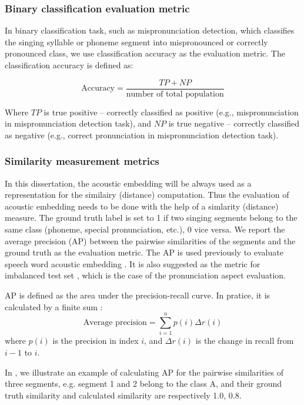 \subsubsection{Binary classification evaluation metric}

In binary classification task, such as mispronunciation detection, which classifies the singing syllable or phoneme segment into mispronounced or correctly pronounced class, we use classification accuracy as the evaluation metric. The classification accuracy is defined as:

\begin{equation}
\textrm{Accuracy} = \frac{TP + NP}{\textrm{number of total population}}
\end{equation}

Where $TP$ is true positive -- correctly classified as positive (e.g., mispronunciation in mispronunciation detection task), and $NP$ is true negative -- correctly classified as negative (e.g., correct pronunciation in mispronunciation detection task). 

\subsubsection{Similarity measurement metrics}

In this dissertation, the acoustic embedding will be always used as a representation for the similairy (distance) computation. Thus the evaluation of acoustic embedding needs to be done with the help of a simlarity (distance) measure. The ground truth label is set to 1 if two singing segments belong to the same class (phoneme, special pronunciation, etc.), 0 vice versa. We report the average precision (AP) between the pairwise similarities of the segments and the ground truth as the evaluation metric. The AP is used previously to evaluate speech word acoustic embedding \cite{Kampera,Settle2016a}. It is also suggested as the metric for imbalanced test set \cite{Davis2006}, which is the case of the pronunciation aspect evaluation.

AP is defined as the area under the precision-recall curve. In pratice, it is calculated by a finite sum :
\begin{equation}
\textrm{Average precision} = \sum_{i=1}^{n} p(i)\Delta r(i)
\end{equation} 
where $p(i)$ is the precision in index $i$, and  $\Delta r(i)$ is the change in recall from $i-1$ to $i$.

In , we illustrate an example of calculating AP for the pairwise similarities of three segments, e.g. segment 1 and 2 belong to the class A, and their ground truth similarity and calculated similarity are respectively 1.0, 0.8.

